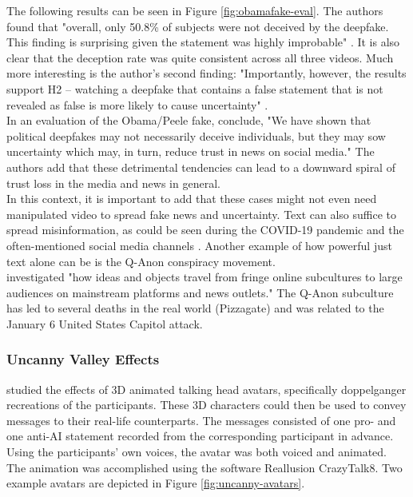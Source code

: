 \documentclass[
  a4paper,  %
  twoside,  %
  bibliography=totoc,
  headsepline,
  cleardoublepage=empty,
  parskip=half,
  draft=false
]{scrbook}
\begin{document}
The following results can be seen in Figure \ref{fig:obamafake-eval}. The authors found that "overall, only 50.8\% of subjects were not deceived by the deepfake. This finding is surprising given the statement was highly improbable" \cite{vaccariDeepfakesDisinformationExploring2020}. 
It is also clear that the deception rate was quite consistent across all three videos. Much more interesting is the author's second finding: "Importantly, however, the results support H2 – watching a deepfake that contains a false statement that is not revealed as false is more likely to cause uncertainty" \cite{vaccariDeepfakesDisinformationExploring2020}. \\
In an evaluation of the Obama/Peele fake, \citet{vaccariDeepfakesDisinformationExploring2020} conclude, "We have shown that political deepfakes may not necessarily deceive individuals, but they may sow uncertainty which may, in turn, reduce trust in news on social media." The authors add that these detrimental tendencies can lead to a downward spiral of trust loss in the media and news in general. \\
In this context, it is important to add that these cases might not even need manipulated video to spread fake news and uncertainty. Text can also suffice to spread misinformation, as could be seen during the COVID-19 pandemic and the often-mentioned social media channels \cite{naeemExplorationHowFake2021}. Another example of how powerful just text alone can be is the Q-Anon conspiracy movement. \\
\citet{zeeuwTracingNormieficationCrossplatform2020} investigated "how ideas and objects travel from fringe online subcultures to large audiences on mainstream platforms and news outlets." The Q-Anon subculture has led to several deaths in the real world (Pizzagate) and was related to the January 6 United States Capitol attack.

\subsubsection*{Uncanny Valley Effects}
 studied the effects of 3D animated talking head avatars, specifically doppelganger recreations of the participants. These 3D characters could then be used to convey messages to their real-life counterparts. The messages consisted of one pro- and one anti-AI statement recorded from the corresponding participant in advance. Using the participants' own voices, the avatar was both voiced and animated. The animation was accomplished using the software Reallusion CrazyTalk8. Two example avatars are depicted in Figure \ref{fig:uncanny-avatars}.
\end{document}
